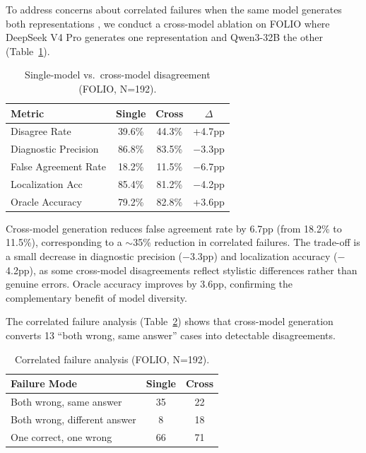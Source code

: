 \documentclass[11pt,a4paper]{article}
\begin{document}
To address concerns about correlated failures when the same model generates both representations \cite{denisovblanch2026}, we conduct a cross-model ablation on FOLIO where DeepSeek V4 Pro generates one representation and Qwen3-32B the other (Table~\ref{tab:cross-model}).

\begin{table}[t]
\centering
\small
\caption{Single-model vs.\ cross-model disagreement (FOLIO, N=192).}
\label{tab:cross-model}
\begin{tabular}{@{}lccc@{}}
\toprule
\textbf{Metric} & \textbf{Single} & \textbf{Cross} & \textbf{$\Delta$} \\
\midrule
Disagree Rate & 39.6\% & 44.3\% & +4.7pp \\
Diagnostic Precision & 86.8\% & 83.5\% & $-$3.3pp \\
False Agreement Rate & 18.2\% & 11.5\% & $-$6.7pp \\
Localization Acc & 85.4\% & 81.2\% & $-$4.2pp \\
Oracle Accuracy & 79.2\% & 82.8\% & +3.6pp \\
\bottomrule
\end{tabular}
\end{table}

Cross-model generation reduces false agreement rate by 6.7pp (from 18.2\% to 11.5\%), corresponding to a $\sim$35\% reduction in correlated failures. The trade-off is a small decrease in diagnostic precision ($-$3.3pp) and localization accuracy ($-$4.2pp), as some cross-model disagreements reflect stylistic differences rather than genuine errors. Oracle accuracy improves by 3.6pp, confirming the complementary benefit of model diversity.

The correlated failure analysis (Table~\ref{tab:correlated}) shows that cross-model generation converts 13 ``both wrong, same answer'' cases into detectable disagreements.

\begin{table}[t]
\centering
\small
\caption{Correlated failure analysis (FOLIO, N=192).}
\label{tab:correlated}
\begin{tabular}{@{}lcc@{}}
\toprule
\textbf{Failure Mode} & \textbf{Single} & \textbf{Cross} \\
\midrule
Both wrong, same answer & 35 & 22 \\
Both wrong, different answer & 8 & 18 \\
One correct, one wrong & 66 & 71 \\
\bottomrule
\end{tabular}
\end{table}
\end{document}
